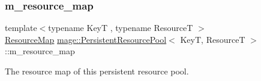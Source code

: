 \subsubsection{\texorpdfstring{m\+\_\+resource\+\_\+map}{m\_resource\_map}}
{\footnotesize\ttfamily template$<$typename KeyT , typename ResourceT $>$ \\
\mbox{\hyperlink{classmage_1_1_persistent_resource_pool_a9215c5816fc45ab5f772625df2a8a60c}{Resource\+Map}} \mbox{\hyperlink{classmage_1_1_persistent_resource_pool}{mage\+::\+Persistent\+Resource\+Pool}}$<$ KeyT, ResourceT $>$\+::m\+\_\+resource\+\_\+map\hspace{0.3cm}{\ttfamily [private]}}

The resource map of this persistent resource pool. 